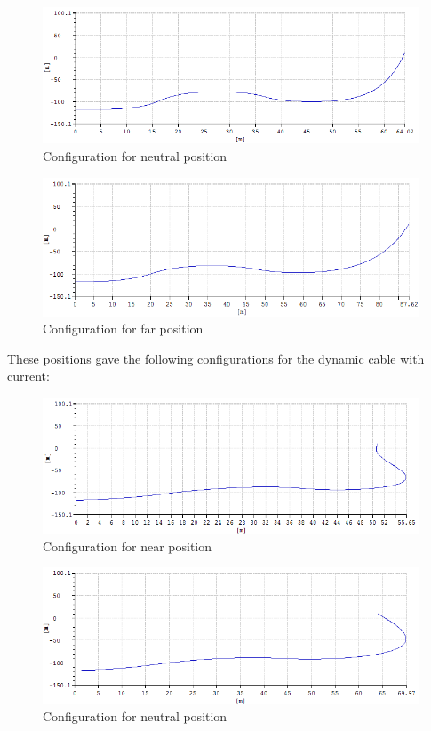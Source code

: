 \begin{figure}[H]
\centering
\includegraphics[scale=0.5]{figures/configneu}
\caption{Configuration for neutral position}
 \label{fig:configneu}
\end{figure}

\begin{figure}[H]
\centering
\includegraphics[scale=0.5]{figures/configfar}
\caption{Configuration for far position}
 \label{fig:configfar}
\end{figure}

\noindent These positions gave the following configurations for the dynamic cable with current: 
\begin{figure}[H]
\centering
\includegraphics[scale=0.5]{figures/confignearc}
\caption{Configuration for near position}
 \label{fig:confignear}
\end{figure}

\begin{figure}[H]
\centering
\includegraphics[scale=0.5]{figures/configneuc}
\caption{Configuration for neutral position}
 \label{fig:configneu}
\end{figure}

